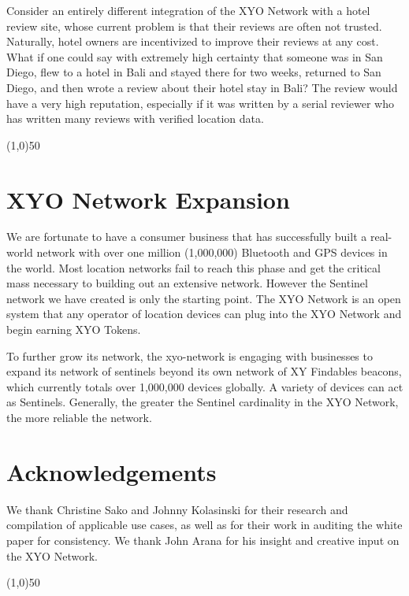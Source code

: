\documentclass{article}
\begin{document}
Consider an entirely different integration of the XYO Network with a hotel review site, whose current problem is that their reviews are often not trusted. Naturally, hotel owners are incentivized to improve their reviews at any cost. What if one could say with extremely high \gls{certainty} that someone was in San Diego, flew to a hotel in Bali and stayed there for two weeks, returned to San Diego, and then wrote a review about their hotel stay in Bali? The review would have a very high reputation, especially if it was written by a serial reviewer who has written many reviews with verified location data.

\begin{center}
\line(1,0){50}
\end{center}

\section {XYO Network Expansion}
We are fortunate to have a consumer business that has successfully built a real-world network with over one million (1,000,000) Bluetooth and GPS devices in the world. Most location networks fail to reach this phase and get the critical mass necessary to building out an extensive network. However the Sentinel network we have created is only the starting point. The XYO Network is an open system that any operator of location devices can plug into the XYO Network and begin earning XYO Tokens.

To further grow its network, the \Gls{xyo-network} is engaging with businesses to expand its network of \Glspl{sentinel} beyond its own network of XY Findables beacons, which currently totals over 1,000,000 devices globally. A variety of devices can act as Sentinels. Generally, the greater the Sentinel cardinality in the XYO Network, the more reliable the network.


\section {Acknowledgements}

We thank Christine Sako and Johnny Kolasinski for their research and compilation of applicable use cases, as well as for their work in auditing the white paper for consistency. We  thank John Arana for his insight and creative input on the XYO Network.


\begin{center}
\line(1,0){50}
\end{center}
\end{document}
